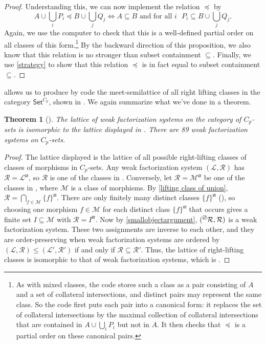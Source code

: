 \documentclass{amsart}
\newcommand{\computerassisted}{\faLaptopCode}
\newcommand{\Set}{\mathsf{Set}}
\newcommand{\CpSet}{\Set^{C_p}}
\newcommand{\cat}{\mathcal}
\newcommand{\llp}[1]{\prescript{\boxslash}{}{#1}}
\newcommand{\rlp}[1]{{#1}^{\boxslash}}
\numberwithin{equation}{section}
\newtheorem{theorem}[equation]{Theorem}
\theoremstyle{definition}
\begin{document}
\begin{proof}
	Understanding this, we can now implement the relation $\preceq$ by
	\[
		A \cup \bigcup_i P_i  \preceq B \cup \bigcup_j Q_j \iff A \subseteq B \text{ and for all $i$ } P_i \subseteq B \cup \bigcup_j Q_j.
	\]
	Again, we use the computer to check that this is a well-defined partial order on all classes of this form.\footnote{As with mixed classes, the code stores such a class as a pair consisting of $A$ and a set of collateral intersections, and distinct pairs may represent the same class. So the code first puts each pair into a canonical form: it replaces the set of collateral intersections by the maximal collection of collateral intersections that are contained in $A \cup \bigcup_i P_i$ but not in $A$. It then checks that $\preceq$ is a partial order on these canonical pairs.} By the backward direction of this proposition, we also know that this relation is no stronger than subset containment $\subseteq$. Finally, we use \cref{strategy} to show that this relation $\preceq$ is in fact equal to subset containment $\subseteq$.
\end{proof}

 allows us to produce by code \cite{code} the meet-semilattice of all right lifting classes in the category $\CpSet$, shown in . We again summarize what we've done in a theorem.

\begin{theorem}[\computerassisted]
	\label{thm:wfs lattice}
	The lattice of weak factorization systems on the category of $C_p$-sets is isomorphic to the lattice displayed in . There are 89 weak factorization systems on $C_p$-sets.
\end{theorem}

\begin{proof}
	The lattice displayed is the lattice of all possible right-lifting classes of classes of morphisms in $C_p$-sets. Any weak factorization system $(\cat L, \cat R)$ has $\cat R = \rlp{\cat L}$, so $\cat R$ is one of the classes in . Conversely, let $\cat R = \rlp{\mathcal M}$ be one of the classes in , where $\mathcal M$ is a class of morphisms. By \cref{lifting class of union}, $\cat R = \bigcap_{f \in \mathcal M} \rlp{\{f\}}$. There are only finitely many distinct classes $\rlp{\{f\}}$ (), so choosing one morphism $f \in \mathcal M$ for each distinct class $\rlp{\{f\}}$ that occurs gives a finite set $I \subseteq \mathcal M$ with $\cat R = \rlp{I}$. Now by \cref{smallobjectargument}, $(\llp{\cat R}, \cat R)$ is a weak factorization system. These two assignments are inverse to each other, and they are order-preserving when weak factorization systems are ordered by $(\cat L, \cat R) \leq (\cat L', \cat R')$ if and only if $\cat R \subseteq \cat R'$. Thus, the lattice of right-lifting classes is isomorphic to that of weak factorization systems, which is .
\end{proof}
\end{document}
